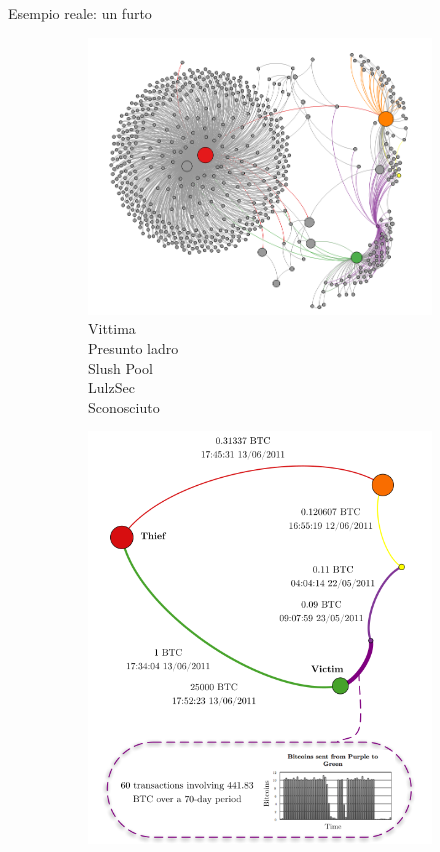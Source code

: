 \documentclass[italian]{beamer}
\begin{document}
\begin{frame}{Esempio reale: un furto} %
\begin{figure}[ht]
  \centering
  \begin{subfigure}{0.45\textwidth}
    \includegraphics[width=\textwidth]{anonimato_1_11.PNG}
    \caption*{
    \textcolor{verde}{Vittima}\\
    \textcolor{rosso}{Presunto ladro}\\
    \textcolor{viola}{Slush Pool}\\
    \textcolor{arancione}{LulzSec}\\
    \textcolor{giallo}{Sconosciuto}
    }
  \end{subfigure}
  \begin{subfigure}{0.45\textwidth}
    \includegraphics[width=\textwidth]{anonimato_1_12.PNG}

\end{subfigure}
\end{figure}
\end{frame}
\end{document}
